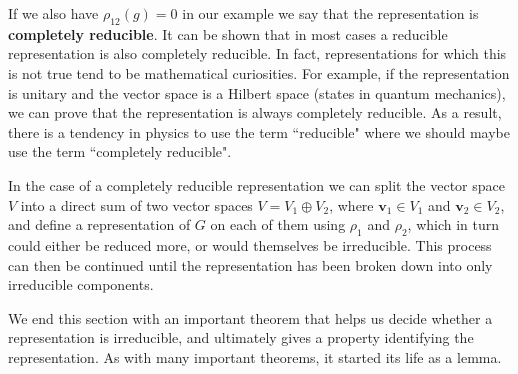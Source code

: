 \documentclass[notes.tex]{subfiles}
\begin{document}
If  we also have $\rho_{12}(g)=0$ in our example we say that the representation is {\bf completely reducible}. It can be shown that in most cases a reducible representation is also completely reducible. In fact, representations for which this is not true tend to be mathematical curiosities. For example, if the representation is unitary and the vector space is a Hilbert space (states in quantum mechanics), we can prove that the representation is always completely reducible.  As a result, there is a tendency in physics to use the term ``reducible" where we should maybe use the term ``completely reducible". 

In the case of a completely reducible representation we can split the vector space $V$ into a direct sum of two vector spaces $V=V_1\oplus V_2$, where $\mathbf v_1\in V_1$ and $\mathbf v_2\in V_2$, and define a representation of $G$ on each of them using $\rho_1$ and $\rho_2$, which in turn could either be reduced more, or would themselves be irreducible. This process can then be continued until the representation has been broken down into only irreducible components.

We end this section with an important theorem that helps us decide whether a representation is irreducible, and ultimately gives a property identifying the representation. As with many important theorems, it started its life as a lemma.

%
%
%
%
%
\end{document}

